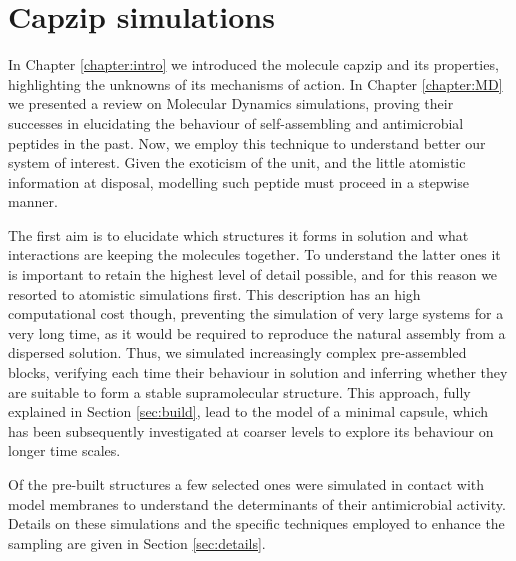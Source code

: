 \chapter{Capzip simulations}

In Chapter \ref{chapter:intro} we introduced the molecule capzip and its properties, highlighting the unknowns of its mechanisms of action. In Chapter \ref{chapter:MD} we presented a review on Molecular Dynamics simulations, proving their successes in elucidating the behaviour of self-assembling and antimicrobial peptides in the past.
%
Now, we employ this technique to understand better our system of interest. Given the exoticism of the unit, and the little atomistic information at disposal, modelling such peptide must proceed in a stepwise manner.

The first aim is to elucidate which structures it forms in solution and what interactions are keeping the molecules together. To understand the latter ones it is important to retain the highest level of detail possible, and for this reason we resorted to atomistic simulations first.
%
This description has an high computational cost though, preventing the simulation of very large systems for a very long time, as it would be required to reproduce the natural assembly from a dispersed solution.
%
Thus, we simulated increasingly complex pre-assembled blocks, verifying each time their behaviour in solution and inferring whether they are suitable to form a stable supramolecular structure. This approach, fully explained in Section \ref{sec:build}, lead to the model of a minimal capsule, which has been subsequently investigated at coarser levels to explore its behaviour on longer time scales.

Of the pre-built structures a few selected ones were simulated in contact with model membranes to understand the determinants of their antimicrobial activity. Details on these simulations and the specific techniques employed to enhance the sampling are given in Section \ref{sec:details}.

